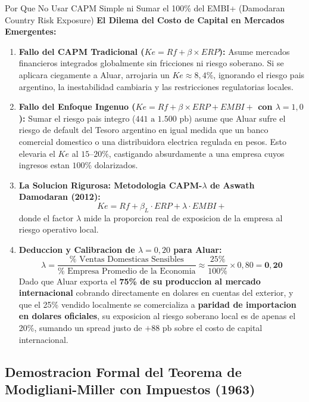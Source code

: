 \documentclass[10pt,a4paper]{article}
\theoremstyle{definition}
\begin{document}
\begin{conceptbox}{Por Que No Usar CAPM Simple ni Sumar el 100\% del EMBI+ (Damodaran Country Risk Exposure)}
\textbf{El Dilema del Costo de Capital en Mercados Emergentes:}
\begin{enumerate}
    \item \textbf{Fallo del CAPM Tradicional ($Ke = Rf + \beta \times ERP$):} Asume mercados financieros integrados globalmente sin fricciones ni riesgo soberano. Si se aplicara ciegamente a Aluar, arrojaria un $Ke \approx 8,4\%$, ignorando el riesgo pais argentino, la inestabilidad cambiaria y las restricciones regulatorias locales.
    \item \textbf{Fallo del Enfoque Ingenuo ($Ke = Rf + \beta \times ERP + EMBI+$ con $\lambda = 1,0$):} Sumar el riesgo pais integro ($441\text{ a }1.500\text{ pb}$) asume que Aluar sufre el riesgo de default del Tesoro argentino en igual medida que un banco comercial domestico o una distribuidora electrica regulada en pesos. Esto elevaria el $Ke$ al $15\text{--}20\%$, castigando absurdamente a una empresa cuyos ingresos estan $100\%$ dolarizados.
    \item \textbf{La Solucion Rigurosa: Metodologia CAPM-$\lambda$ de Aswath Damodaran (2012):}
    \begin{equation}
    Ke = Rf + \beta_L \cdot ERP + \lambda \cdot EMBI+
    \end{equation}
    donde el factor $\lambda$ mide la proporcion real de exposicion de la empresa al riesgo operativo local.
    \item \textbf{Deduccion y Calibracion de $\lambda = 0,20$ para Aluar:}
    \begin{equation}
    \lambda = \frac{\% \text{ Ventas Domesticas Sensibles}}{\% \text{ Empresa Promedio de la Economia}} \approx \frac{25\%}{100\%} \times 0,80 = \mathbf{0,20}
    \end{equation}
    Dado que Aluar exporta el \textbf{75\% de su produccion al mercado internacional} cobrando directamente en dolares en cuentas del exterior, y que el 25\% vendido localmente se comercializa a \textbf{paridad de importacion en dolares oficiales}, su exposicion al riesgo soberano local es de apenas el 20\%, sumando un spread justo de $+88\text{ pb}$ sobre el costo de capital internacional.
\end{enumerate}
\end{conceptbox}

\subsection{Demostracion Formal del Teorema de Modigliani-Miller con Impuestos (1963)}
\end{document}
